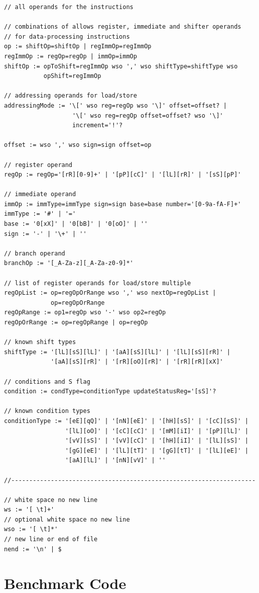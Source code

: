 \documentclass[a4paper, 11pt, onecolumn]{article}
\begin{document}
\begin{lstlisting}[basicstyle=\ttfamily\footnotesize, caption={[Vollständige Grammatik]}]
// all operands for the instructions

// combinations of allows register, immediate and shifter operands
// for data-processing instructions
op := shiftOp=shiftOp | regImmOp=regImmOp
regImmOp := regOp=regOp | immOp=immOp
shiftOp := opToShift=regImmOp wso ',' wso shiftType=shiftType wso
           opShift=regImmOp

// addressing operands for load/store
addressingMode := '\[' wso reg=regOp wso '\]' offset=offset? |
                   '\[' wso reg=regOp offset=offset? wso '\]'
                   increment='!'?
                   
offset := wso ',' wso sign=sign offset=op

// register operand
regOp := regOp='[rR][0-9]+' | '[pP][cC]' | '[lL][rR]' | '[sS][pP]'

// immediate operand
immOp := immType=immType sign=sign base=base number='[0-9a-fA-F]+'
immType := '#' | '='
base := '0[xX]' | '0[bB]' | '0[oO]' | ''
sign := '-' | '\+' | ''

// branch operand
branchOp := '[_A-Za-z][_A-Za-z0-9]*'

// list of register operands for load/store multiple
regOpList := op=regOpOrRange wso ',' wso nextOp=regOpList |
             op=regOpOrRange
regOpRange := op1=regOp wso '-' wso op2=regOp
regOpOrRange := op=regOpRange | op=regOp

// known shift types
shiftType := '[lL][sS][lL]' | '[aA][sS][lL]' | '[lL][sS][rR]' |
             '[aA][sS][rR]' | '[rR][oO][rR]' | '[rR][rR][xX]'

// conditions and S flag
condition := condType=conditionType updateStatusReg='[sS]'?

// known condition types
conditionType := '[eE][qQ]' | '[nN][eE]' | '[hH][sS]' | '[cC][sS]' |
                 '[lL][oO]' | '[cC][cC]' | '[mM][iI]' | '[pP][lL]' |
                 '[vV][sS]' | '[vV][cC]' | '[hH][iI]' | '[lL][sS]' |
                 '[gG][eE]' | '[lL][tT]' | '[gG][tT]' | '[lL][eE]' |
                 '[aA][lL]' | '[nN][vV]' | ''

//--------------------------------------------------------------------

// white space no new line 
ws := '[ \t]+'
// optional white space no new line 
wso := '[ \t]*'
// new line or end of file
nend := '\n' | $
\end{lstlisting}

\section{Benchmark Code}
\end{document}
